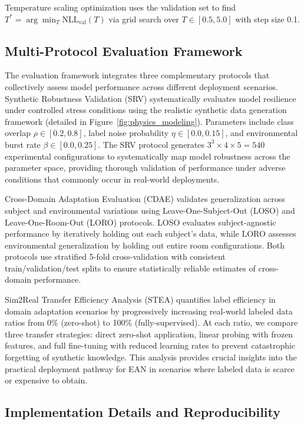 \documentclass[lettersize,journal]{IEEEtran}
\begin{document}
Temperature scaling optimization uses the validation set to find $T^* = \arg\min_T \text{NLL}_{\text{val}}(T)$ via grid search over $T \in [0.5, 5.0]$ with step size 0.1.

\subsection{Multi-Protocol Evaluation Framework}

The evaluation framework integrates three complementary protocols that collectively assess model performance across different deployment scenarios. Synthetic Robustness Validation (SRV) systematically evaluates model resilience under controlled stress conditions using the realistic synthetic data generation framework (detailed in Figure~\ref{fig:physics_modeling}). Parameters include class overlap $\rho \in [0.2, 0.8]$, label noise probability $\eta \in [0.0, 0.15]$, and environmental burst rate $\beta \in [0.0, 0.25]$. The SRV protocol generates $3^3 \times 4 \times 5 = 540$ experimental configurations to systematically map model robustness across the parameter space, providing thorough validation of performance under adverse conditions that commonly occur in real-world deployments.

Cross-Domain Adaptation Evaluation (CDAE) validates generalization across subject and environmental variations using Leave-One-Subject-Out (LOSO) and Leave-One-Room-Out (LORO) protocols. LOSO evaluates subject-agnostic performance by iteratively holding out each subject's data, while LORO assesses environmental generalization by holding out entire room configurations. Both protocols use stratified 5-fold cross-validation with consistent train/validation/test splits to ensure statistically reliable estimates of cross-domain performance.

Sim2Real Transfer Efficiency Analysis (STEA) quantifies label efficiency in domain adaptation scenarios by progressively increasing real-world labeled data ratios from 0\% (zero-shot) to 100\% (fully-supervised). At each ratio, we compare three transfer strategies: direct zero-shot application, linear probing with frozen features, and full fine-tuning with reduced learning rates to prevent catastrophic forgetting of synthetic knowledge. This analysis provides crucial insights into the practical deployment pathway for EAN in scenarios where labeled data is scarce or expensive to obtain.

\subsection{Implementation Details and Reproducibility}
\end{document}
